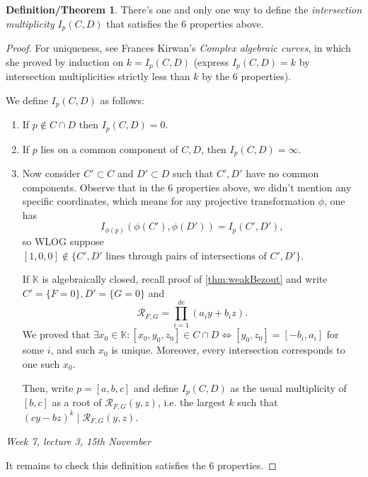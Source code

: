 \documentclass{article}
\newcommand{\K}{\mathbb{K}}
\newcommand{\re}{\mathcal{R}}
\theoremstyle{definition}
\newtheorem{defnthm}[defn]{Definition/Theorem}
\begin{document}
\begin{defnthm}
There's one and only one way to define the \textit{intersection multiplicity} $I_p(C,D)$ that satisfies the 6 properties above.
\end{defnthm}
\begin{proof}
For uniqueness, see Frances Kirwan's \textit{Complex algebraic curves}, in which she proved by induction on $k=I_p(C,D)$ (express $I_p(C,D)=k$ by intersection multiplicities strictly less than $k$ by the 6 properties).

We define $I_p(C,D)$ as follows:
\begin{enumerate}
\item If $p\notin C\cap D$ then $I_p(C,D)=0$.
\item If $p$ lies on a common component of $C,D$, then $I_p(C,D)=\infty$.

\item Now consider $C'\subset C$ and $D'\subset D$ such that $C',D'$ have no common components. Observe that in the 6 properties above, we didn't mention any specific coordinates, which means for any projective transformation $\phi$, one has
\[
I_{\phi(p)}(\phi(C'),\phi(D'))=I_p(C',D'),
\]
so WLOG suppose $[1,0,0]\notin\{C',D'\text{ lines through pairs of intersections of }C',D'\}$.

If $\K$ is algebraically closed, recall proof of \ref{thm:weakBezout} and write $C'=\{F=0\},D'=\{G=0\}$ and
\[
\re_{F,G}=\prod_{i=1}^{de}(a_iy+b_iz).
\]
We proved that $\exists x_0\in\K:[x_0,y_0,z_0]\in C\cap D\iff [y_0,z_0]=[-b_i,a_i]$ for some $i$, and such $x_0$ is unique. Moreover, every intersection corresponds to one such $x_0$.

Then, write $p=[a,b,c]$ and define $I_p(C,D)$ as the usual multiplicity of $[b,c]$ as a root of $\re_{F,G}(y,z)$, i.e. the largest $k$ such that $(cy-bz)^k\mid\re_{F,G}(y,z)$.
\end{enumerate}

\begin{flushright}
\textit{Week 7, lecture 3, 15th November}
\end{flushright}

It remains to check this definition satisfies the 6 properties.


\end{proof}
\end{document}
